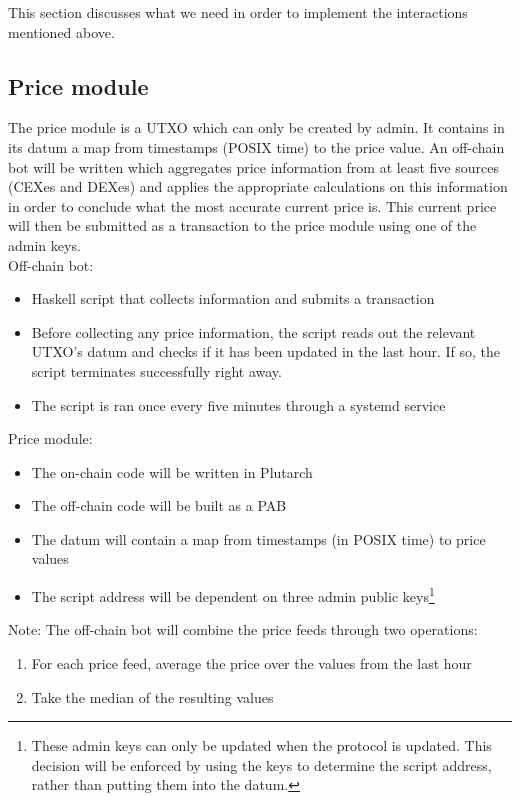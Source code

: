 \documentclass{article} %
\begin{document}
This section discusses what we need in order to implement the interactions
mentioned above.

\subsection{Price module}

The price module is a UTXO which can only be created by admin.
It contains in its datum a map from timestamps (POSIX time) to the price value.
An off-chain bot will be written which aggregates price information from at
least five sources (CEXes and DEXes) and applies the appropriate calculations on
this information in order to conclude what the most accurate current price is.
This current price will then be submitted as a transaction to the price module
using one of the admin keys. \\

Off-chain bot:
\begin{itemize}
  \item Haskell script that collects information and submits a transaction
  \item Before collecting any price information, the script reads out the
    relevant UTXO's datum and checks if it has been updated in the last hour. If
    so, the script terminates successfully right away.
  \item The script is ran once every five minutes through a systemd service
\end{itemize}

Price module:
\begin{itemize}
  \item The on-chain code will be written in Plutarch
  \item The off-chain code will be built as a PAB
  \item The datum will contain a map from timestamps (in POSIX time) to price
    values
  \item The script address will be dependent on three admin public
    keys\footnote{
      These admin keys can only be updated when the protocol is updated.
      This decision will be enforced by using the keys to determine the script
      address, rather than putting them into the datum.
    }
\end{itemize}

Note: The off-chain bot will combine the price feeds through two operations:
\begin{enumerate}
  \item For each price feed, average the price over the values from the last
    hour
  \item Take the median of the resulting values
\end{enumerate}
\end{document}
